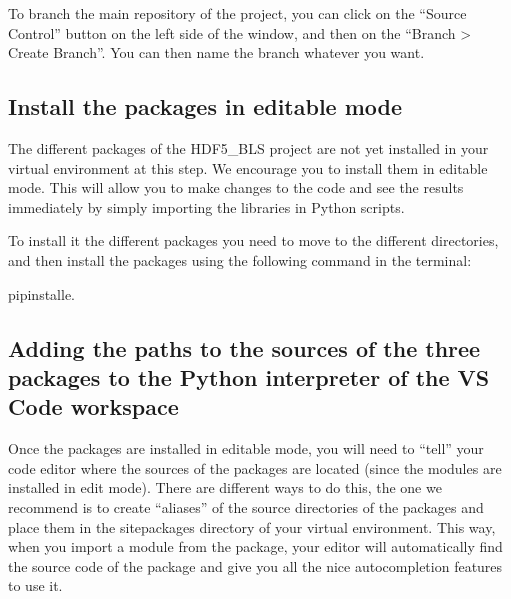 \documentclass[letterpaper,10pt,english]{sphinxmanual}
\begin{document}
\sphinxAtStartPar
To branch the main repository of the project, you can click on the “Source Control” button on the left side of the window, and then on the “Branch \textgreater{} Create Branch”. You can then name the branch whatever you want.


\subsection{Install the packages in editable mode}
\label{\detokenize{source/developer/setup:install-the-packages-in-editable-mode}}
\sphinxAtStartPar
The different packages of the HDF5\_BLS project are not yet installed in your virtual environment at this step. We encourage you to install them in editable mode. This will allow you to make changes to the code and see the results immediately by simply importing the libraries in Python scripts.

\sphinxAtStartPar
To install it the different packages you need to move to the different directories, and then install the packages using the following command in the terminal:

\begin{sphinxVerbatim}[commandchars=\\\{\}]
pipinstall\PYGZhy{}e.
\end{sphinxVerbatim}


\subsection{Adding the paths to the sources of the three packages to the Python interpreter of the VS Code workspace}
\label{\detokenize{source/developer/setup:adding-the-paths-to-the-sources-of-the-three-packages-to-the-python-interpreter-of-the-vs-code-workspace}}
\sphinxAtStartPar
Once the packages are installed in editable mode, you will need to “tell” your code editor where the sources of the packages are located (since the modules are installed in edit mode). There are different ways to do this, the one we recommend is to create “aliases” of the source directories of the packages and place them in the site\sphinxhyphen{}packages directory of your virtual environment. This way, when you import a module from the package, your editor will automatically find the source code of the package and give you all the nice autocompletion features to use it.
\end{document}
